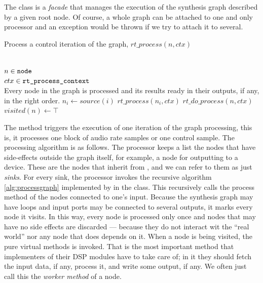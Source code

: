 The  class is a 
\emph{facade} that manages the execution of the synthesis graph
described by a given root node. Of course, a whole graph can be
attached to one and only processor and an exception would be thrown if
we try to attach it to several.

\begin{algorithm}
  \caption{Process a control iteration of the graph, $rt\_process (n,
    ctx)$}
\label{alg:processgraph}
\begin{algorithmic}
  \REQUIRE $\;$\\
  $n \in \mbox{\texttt{node}}$ \\
  $ctx \in \mbox{\texttt{rt\_process\_context}}$
  \ENSURE $\;$\\Every node in the graph is processed and its results ready in their
  outputs, if any, in the right order.
  \medskip
  \STATE $n_i \gets source (i)$
  \STATE $rt\_process (n_i, ctx)$
  \ENDIF
  \ENDFOR
  \STATE $rt\_do\_process (n, ctx)$
  \STATE $visited (n) \gets \top$
  \ENDIF
\end{algorithmic}
\end{algorithm}

The  method triggers the execution of one
iteration of the graph processing, this is, it processes one block of
audio rate samples or one control sample. The processing algorithm is
as follows. The processor keeps a list the nodes that have
side-effects outside the graph itself, for example, a node for
outputting to a device. These are the nodes that inherit from
, and we can refer to them as just 
\emph{sinks}. For every sink, the processor invokes the recursive
algorithm \ref{alg:processgraph} implemented by  in
the  class. This recursively calls the process method of
the nodes connected to one's input. Because the synthesis graph may
have loops and input ports may be connected to several outputs, it
marks every node it visits. In this way, every node is processed only
once and nodes that may have no side effects are discarded --- because
they do not interact wit the ``real world'' nor any node that does
depends on it. When a node is being visited, the pure virtual
 methods is invoked. That is the most important
method that implementers of their DSP modules have to take care of; in
it they should fetch the input data, if any, process it, and write
some output, if any. We often just call this the \emph{worker method}
of a node.

